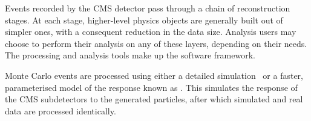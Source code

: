 Events recorded by the \ac{CMS} detector pass through a chain of reconstruction
stages. At each stage, higher-level physics objects are generally built out of
simpler ones, with a consequent reduction in the data size. Analysis users may
choose to perform their analysis on any of these layers, depending on their
needs. The processing and analysis tools make up the \cmssw software framework.

Monte Carlo events are processed using either a detailed \geantfour
simulation~\cite{geant_paper} or a faster, parameterised model of the response
known as \fastsim. This simulates the response of the \ac{CMS} subdetectors to
the generated particles, after which simulated and real data are processed
identically.
